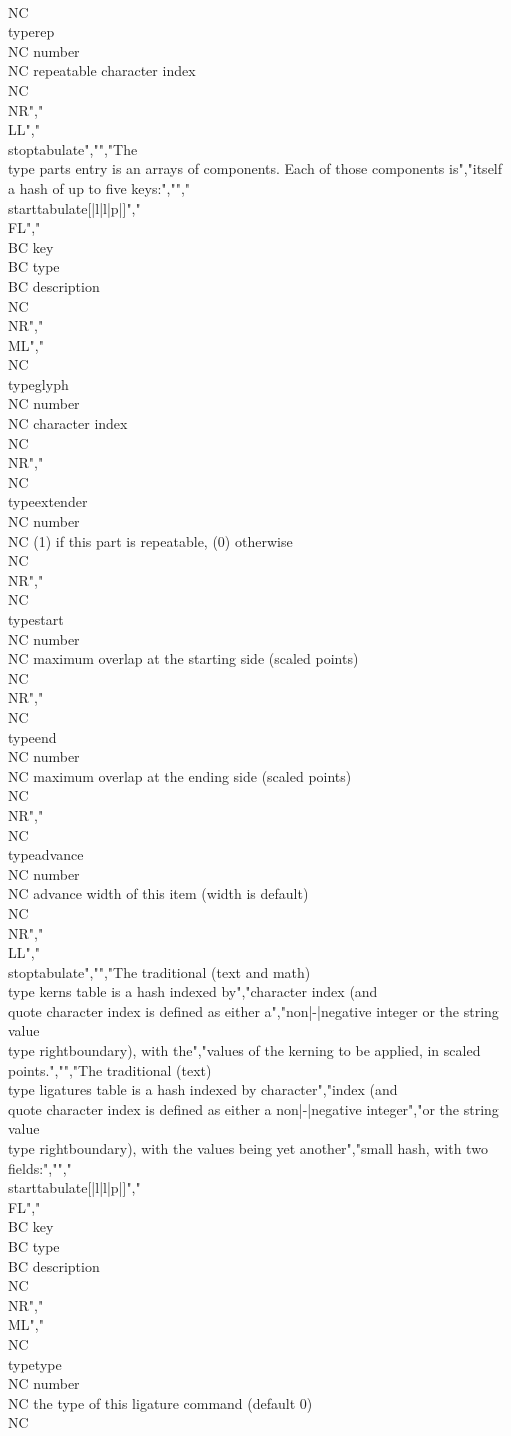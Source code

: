 \\NC \\type{rep} \\NC number \\NC repeatable character index \\NC \\NR","\\LL","\\stoptabulate","","The \\type {parts} entry is an arrays of components. Each of those components is","itself a hash of up to five keys:","","\\starttabulate[|l|l|p|]","\\FL","\\BC key             \\BC type   \\BC description                                          \\NC \\NR","\\ML","\\NC \\type{glyph}    \\NC number \\NC character index                                      \\NC \\NR","\\NC \\type{extender} \\NC number \\NC (1) if this part is repeatable, (0) otherwise        \\NC \\NR","\\NC \\type{start}    \\NC number \\NC maximum overlap at the starting side (scaled points) \\NC \\NR","\\NC \\type{end}      \\NC number \\NC maximum overlap at the ending side (scaled points)   \\NC \\NR","\\NC \\type{advance}  \\NC number \\NC advance width of this item (width is default)        \\NC \\NR","\\LL","\\stoptabulate","","The traditional (text and math) \\type {kerns} table is a hash indexed by","character index (and \\quote {character index} is defined as either a","non|-|negative integer or the string value \\type {rightboundary}), with the","values of the kerning to be applied, in scaled points.","","The traditional (text) \\type {ligatures} table is a hash indexed by character","index (and \\quote {character index} is defined as either a non|-|negative integer","or the string value \\type {rightboundary}), with the values being yet another","small hash, with two fields:","","\\starttabulate[|l|l|p|]","\\FL","\\BC key         \\BC type   \\BC description                                   \\NC \\NR","\\ML","\\NC \\type{type} \\NC number \\NC the type of this ligature command (default 0) \\NC 